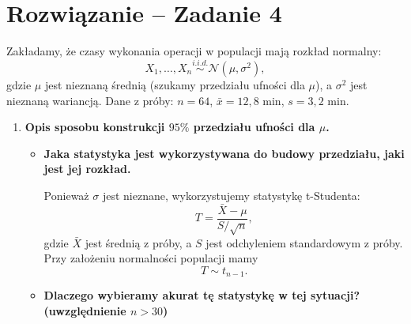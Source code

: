 \documentclass[polish, 10pt]{extarticle}
\begin{document}
\section*{Rozwiązanie -- Zadanie 4}

Zakładamy, że czasy wykonania operacji w populacji mają rozkład normalny:
\[
X_1,\dots,X_n \stackrel{i.i.d.}{\sim} \mathcal{N}(\mu,\sigma^2),
\]
gdzie $\mu$ jest nieznaną średnią (szukamy przedziału ufności dla $\mu$), a $\sigma^2$ jest nieznaną wariancją.
Dane z próby: $n=64$, $\bar{x}=12{,}8$ min, $s=3{,}2$ min.

\begin{enumerate}
\item \textbf{Opis sposobu konstrukcji $95\%$ przedziału ufności dla $\mu$.}

\begin{itemize}
\item[a)] \textbf{Jaka statystyka jest wykorzystywana do budowy przedziału, jaki jest jej rozkład.}

Ponieważ $\sigma$ jest nieznane, wykorzystujemy statystykę t-Studenta:
\[
T=\frac{\bar{X}-\mu}{S/\sqrt{n}},
\]
gdzie $\bar{X}$ jest średnią z próby, a $S$ jest odchyleniem standardowym z próby.
Przy założeniu normalności populacji mamy
\[
T\sim t_{n-1}.
\]





\item[b)] \textbf{Dlaczego wybieramy akurat tę statystykę w tej sytuacji? (uwzględnienie $n>30$)}


\end{itemize}
\end{enumerate}
\end{document}
